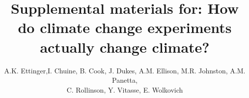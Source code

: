 \documentclass{article}
\begin{document}
 
\title{Supplemental materials for: How do climate change experiments actually change climate?} %

\author{A.K. Ettinger,I. Chuine, B. Cook, J. Dukes, A.M. Ellison, M.R. Johnston, A.M. Panetta,\\ C. Rollinson, Y. Vitasse, E. Wolkovich}
\maketitle  %
\renewcommand{\thetable}{S\arabic{table}}
\renewcommand{\thefigure}{S\arabic{figure}}
\end{document}

